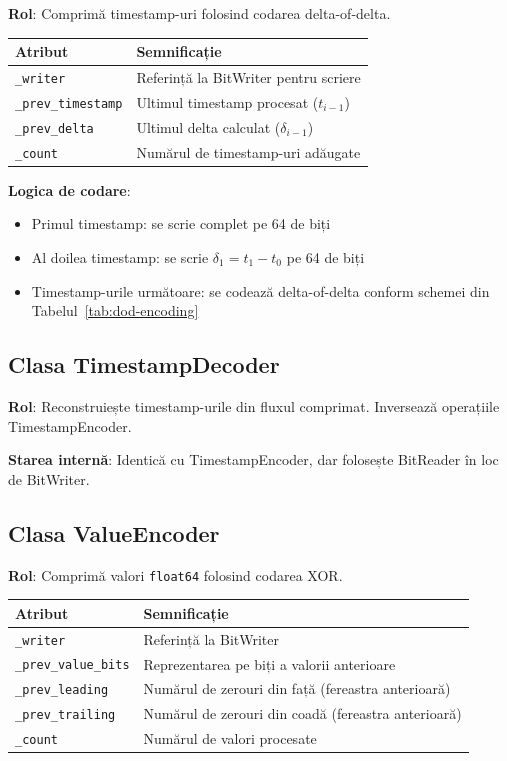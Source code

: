 \textbf{Rol}: Comprimă timestamp-uri folosind codarea delta-of-delta.

\begin{center}
\begin{tabular}{|l|p{9cm}|}
\hline
\textbf{Atribut} & \textbf{Semnificație} \\
\hline
\texttt{\_writer} & Referință la BitWriter pentru scriere \\
\texttt{\_prev\_timestamp} & Ultimul timestamp procesat ($t_{i-1}$) \\
\texttt{\_prev\_delta} & Ultimul delta calculat ($\delta_{i-1}$) \\
\texttt{\_count} & Numărul de timestamp-uri adăugate \\
\hline
\end{tabular}
\end{center}

\textbf{Logica de codare}:
\begin{itemize}
    \item Primul timestamp: se scrie complet pe 64 de biți
    \item Al doilea timestamp: se scrie $\delta_1 = t_1 - t_0$ pe 64 de biți
    \item Timestamp-urile următoare: se codează delta-of-delta conform schemei din Tabelul~\ref{tab:dod-encoding}
\end{itemize}

\subsection{Clasa TimestampDecoder}

\textbf{Rol}: Reconstruiește timestamp-urile din fluxul comprimat. Inversează operațiile TimestampEncoder.

\textbf{Starea internă}: Identică cu TimestampEncoder, dar folosește BitReader în loc de BitWriter.

\subsection{Clasa ValueEncoder}

\textbf{Rol}: Comprimă valori \texttt{float64} folosind codarea XOR.

\begin{center}
\begin{tabular}{|l|p{8cm}|}
\hline
\textbf{Atribut} & \textbf{Semnificație} \\
\hline
\texttt{\_writer} & Referință la BitWriter \\
\texttt{\_prev\_value\_bits} & Reprezentarea pe biți a valorii anterioare \\
\texttt{\_prev\_leading} & Numărul de zerouri din față (fereastra anterioară) \\
\texttt{\_prev\_trailing} & Numărul de zerouri din coadă (fereastra anterioară) \\
\texttt{\_count} & Numărul de valori procesate \\
\hline
\end{tabular}
\end{center}


